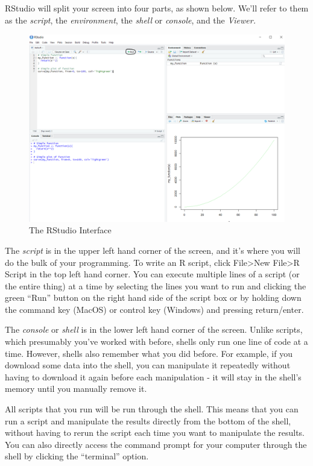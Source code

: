 \documentclass[
]{book}
\begin{document}
RStudio will split your screen into four parts, as shown below. We'll refer to them as the \emph{script}, the \emph{environment}, the \emph{shell} or \emph{console}, and the \emph{Viewer.}

\begin{figure}
\centering
\includegraphics{./images/rstudio2.PNG}
\caption{The RStudio Interface}
\end{figure}

The \emph{script} is in the upper left hand corner of the screen, and it's where you will do the bulk of your programming. To write an R script, click File\textgreater New File\textgreater R Script in the top left hand corner. You can execute multiple lines of a script (or the entire thing) at a time by selecting the lines you want to run and clicking the green ``Run'' button on the right hand side of the script box or by holding down the command key (MacOS) or control key (Windows) and pressing return/enter.

The \emph{console} or \emph{shell} is in the lower left hand corner of the screen. Unlike scripts, which presumably you've worked with before, shells only run one line of code at a time. However, shells also remember what you did before. For example, if you download some data into the shell, you can manipulate it repeatedly without having to download it again before each manipulation - it will stay in the shell's memory until you manually remove it.

All scripts that you run will be run through the shell. This means that you can run a script and manipulate the results directly from the bottom of the shell, without having to rerun the script each time you want to manipulate the results. You can also directly access the command prompt for your computer through the shell by clicking the ``terminal'' option.
\end{document}
